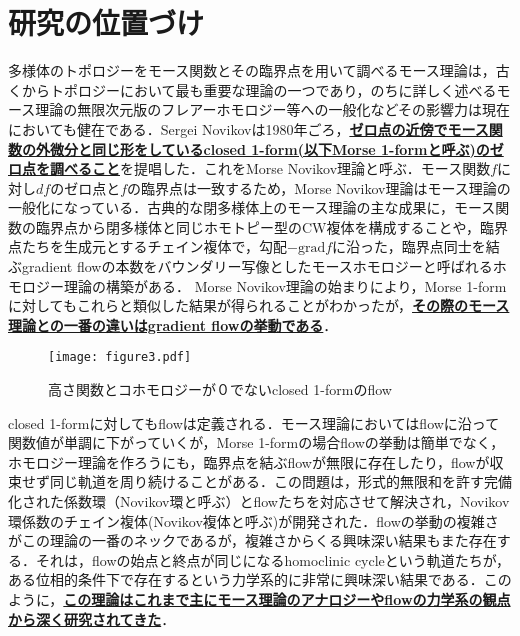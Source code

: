 \documentclass[11pt,a4j,dvipdfmx]{jarticle} 					%
\newcommand{\研究課題名}{象の卵}
\newcommand{\研究機関名}{京都大学}
\newcommand{\研究代表者氏名}{福士　謙二　　　}
\begin{document}

\section{研究の位置づけ}

\noindent
{}

多様体のトポロジーをモース関数とその臨界点を用いて調べるモース理論は，古くからトポロジーにおいて最も重要な理論の一つであり，のちに詳しく述べるモース理論の無限次元版のフレアーホモロジー等への一般化などその影響力は現在においても健在である．Sergei Novikovは1980年ごろ，\textbf{\ul{ゼロ点の近傍でモース関数の外微分と同じ形をしているclosed 1-form(以下Morse 1-formと呼ぶ)のゼロ点を調べること}}を提唱した．これをMorse Novikov理論と呼ぶ．モース関数$f$に対し$df$のゼロ点と$f$の臨界点は一致するため，Morse Novikov理論はモース理論の一般化になっている．古典的な閉多様体上のモース理論の主な成果に，モース関数の臨界点から閉多様体と同じホモトピー型のCW複体を構成することや，臨界点たちを生成元とするチェイン複体で，勾配$-\text{grad} f$に沿った，臨界点同士を結ぶgradient flowの本数をバウンダリー写像としたモースホモロジーと呼ばれるホモロジー理論の構築がある．
Morse Novikov理論の始まりにより，Morse 1-formに対してもこれらと類似した結果が得られることがわかったが，\textbf{\ul{その際のモース理論との一番の違いはgradient flowの挙動である}}．


\begin{wrapfigure}[11]{r}[0mm]{10zw}
    \vspace*{-\intextsep} %
	\texttt{[image: figure3.pdf]}
	\caption{高さ関数とコホモロジーが０でないclosed 1-formのflow}
\end{wrapfigure}
closed 1-formに対してもflowは定義される．モース理論においてはflowに沿って関数値が単調に下がっていくが，Morse 1-formの場合flowの挙動は簡単でなく，ホモロジー理論を作ろうにも，臨界点を結ぶflowが無限に存在したり，flowが収束せず同じ軌道を周り続けることがある．この問題は，形式的無限和を許す完備化された係数環（Novikov環と呼ぶ）とflowたちを対応させて解決され，Novikov環係数のチェイン複体(Novikov複体と呼ぶ)が開発された．flowの挙動の複雑さがこの理論の一番のネックであるが，複雑さからくる興味深い結果もまた存在する．それは，flowの始点と終点が同じになるhomoclinic cycleという軌道たちが，ある位相的条件下で存在するという力学系的に非常に興味深い結果である．このように，\textbf{\ul{この理論はこれまで主にモース理論のアナロジーやflowの力学系の観点から深く研究されてきた}}．
\end{document}

